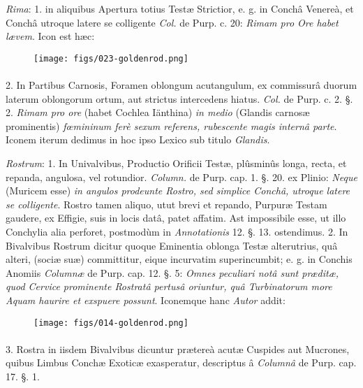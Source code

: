 \documentclass[a4paper, 11pt, oneside, polutonikogreek, german]{article}
\begin{document}
\emph{Rima}: 1. in aliquibus Apertura totius Testæ Strictior, e. g. in Conchâ Venereà, et Conchâ utroque latere se colligente \emph{Col.} de Purp. c. 20: \emph{Rimam pro Ore habet lævem}. Icon est hæc:

\begin{figure}[H]
\centering
\texttt{[image: figs/023-goldenrod.png]}
\end{figure}
\paragraph{}
2. In Partibus Carnosis, Foramen oblongum acutangulum, ex commissurâ duorum laterum oblongorum ortum, aut strictus intercedens hiatus. \emph{Col.} de Purp. c. 2. §. 2. \emph{Rimam pro ore} (habet Cochlea Iänthina) \emph{in medio} (Glandis carnosæ prominentis) \emph{fœmininum ferè sexum referens, rubescente magis internâ parte}. Iconem iterum dedimus in hoc ipso Lexico sub titulo \emph{Glandis}.

\emph{Rostrum}: 1. In Univalvibus, Productio Orificii Testæ, plûsminûs longa, recta, et repanda, angulosa, vel rotundior. \emph{Column.} de Purp. cap. 1. §. 20. ex Plinio: \emph{Neque} (Muricem esse) \emph{in angulos prodeunte Rostro, sed simplice Conchâ, utroque latere se colligente}. Rostro tamen aliquo, utut brevi et repando, Purpuræ Testam gaudere, ex Effigie, suis in locis datâ, patet affatim. Ast impossibile esse, ut illo Conchylia alia perforet, postmodùm in \emph{Annotationis} 12. §. 13. ostendimus. 2. In Bivalvibus Rostrum dicitur quoque Eminentia oblonga Testæ alterutrius, quâ alteri, (sociæ suæ) committitur, eique incurvatim superincumbit; e. g. in Conchis Anomiis \emph{Columnæ} de Purp. cap. 12. §. 5: \emph{Omnes peculiari notâ sunt præditæ, quod Cervice prominente Rostratâ pertusâ oriuntur, quâ Turbinatorum more Aquam haurire et exspuere possunt}. Iconemque hanc \emph{Autor} addit:

\begin{figure}[H]
\centering
\texttt{[image: figs/014-goldenrod.png]}
\end{figure}
\paragraph{}
3. Rostra in iisdem Bivalvibus dicuntur prætereà acutæ Cuspides aut Mucrones, quibus Limbus Conchæ Exoticæ exasperatur, descriptus â \emph{Columnâ} de Purp. cap. 17. §. 1.
\end{document}
